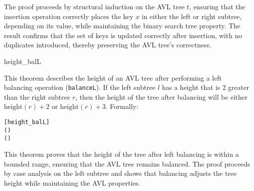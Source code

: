 The proof proceeds by structural induction on the AVL tree \( t \), ensuring that the insertion operation correctly places the key \( x \) in either the left or right subtree, depending on its value, while maintaining the binary search tree property. The result confirms that the set of keys is updated correctly after insertion, with no duplicates introduced, thereby preserving the AVL tree's correctness.

\begin{thm}{height\_balL}

This theorem describes the height of an AVL tree after performing a left balancing operation (\texttt{balanceL}). If the left subtree \(l\) has a height that is 2 greater than the right subtree \(r\), then the height of the tree after balancing will be either \(\text{height}(r) + 2\) or \(\text{height}(r) + 3\). Formally:


\begin{alltt}
	[height_balL]
	\HOLTokenTurnstile{}   \HOLSymConst{=}   \HOLSymConst{\ensuremath{+}}  \HOLSymConst{\HOLTokenConj{}}   \HOLSymConst{\HOLTokenConj{}}   \HOLSymConst{\HOLTokenImp{}}
    (    ) \HOLSymConst{=}   \HOLSymConst{\ensuremath{+}}  \HOLSymConst{\HOLTokenDisj{}}
    (    ) \HOLSymConst{=}   \HOLSymConst{\ensuremath{+}} 
\end{alltt}

\end{thm}

This theorem proves that the height of the tree after left balancing is within a bounded range, ensuring that the AVL tree remains balanced. The proof proceeds by case analysis on the left subtree and shows that balancing adjusts the tree height while maintaining the AVL properties.


